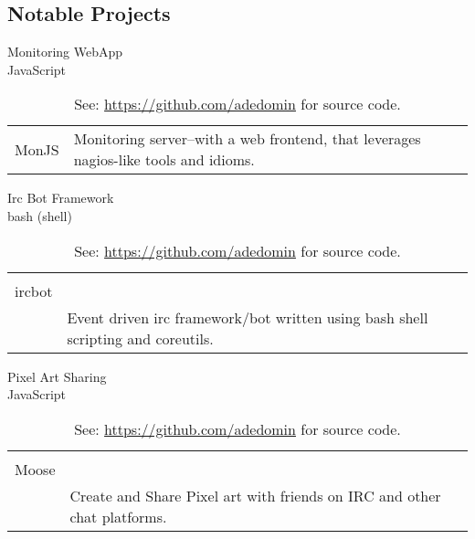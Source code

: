 \documentclass[letterpaper,]{article}
\begin{document}
\subsection{Notable Projects}\label{projects}

\begin{table}[H]
    \centering
    \begin{minipage}[t]{0.30\linewidth}
        \centering
        \caption{
            Monitoring WebApp \\ 
            \fontsize{8}{10}\selectfont JavaScript
        }
        \begin{tabularx}{\textwidth}{r|X}
            MonJS & 
            Monitoring server--with a web frontend, 
            that leverages nagios-like 
            tools and idioms. \\
        \end{tabularx}
    \end{minipage}
    \hspace{0.03\linewidth}
    \begin{minipage}[t]{0.30\linewidth}
        \centering
        \caption{
            Irc Bot Framework \\
            \fontsize{8}{10}\selectfont bash (shell)
        }
        \begin{tabularx}{\textwidth}{r|X}
            \begin{tabular}{@{}r@{}}
                bash \\
                ircbot \\
            \end{tabular} & 
            Event driven irc framework/bot 
            written using bash shell scripting and coreutils. \\
        \end{tabularx}
    \end{minipage}
    \hspace{0.03\linewidth}
    \begin{minipage}[t]{0.30\linewidth}
        \centering
        \caption{
            Pixel Art Sharing \\ 
            \fontsize{8}{10}\selectfont JavaScript
        }
        \begin{tabularx}{\textwidth}{r|X}
            \begin{tabular}{@{}r@{}}
                Captain \\
                Moose \\
            \end{tabular} &
            Create and Share Pixel art with friends on IRC
            and other chat platforms. \\
        \end{tabularx}
    \end{minipage}
    \vfill
    \caption{See: \href{https://github.com/adedomin}{https://github.com/adedomin} for source code.}
\end{table}
\end{document}
